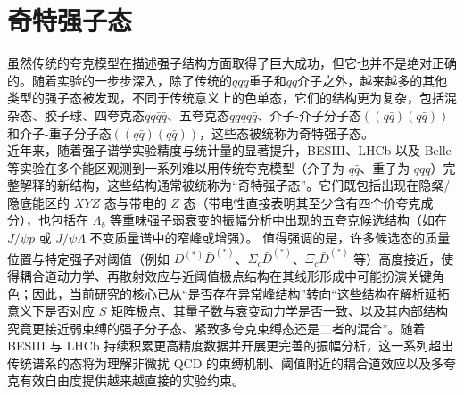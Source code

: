 \section{奇特强子态}
虽然传统的夸克模型在描述强子结构方面取得了巨大成功，但它也并不是绝对正确的。随着实验的一步步深入，除了传统的$qqq$重子和$q\bar{q}$介子之外，越来越多的其他类型的强子态被发现，不同于传统意义上的色单态，它们的结构更为复杂，包括混杂态、胶子球、四夸克态$qq\bar{q}\bar{q}$、五夸克态$qqqq\bar{q}$、介子-介子分子态$((q\bar{q})(q\bar{q}))$和介子-重子分子态$((q\bar{q})(q\bar{q}))$，这些态被统称为奇特强子态。\\
近年来，随着强子谱学实验精度与统计量的显著提升，BESIII、LHCb 以及 Belle 等实验在多个能区观测到一系列难以用传统夸克模型（介子为 $q\bar q$、重子为 $qqq$）完整解释的新结构，这些结构通常被统称为“奇特强子态”。它们既包括出现在隐粲/隐底能区的 $XYZ$ 态与带电的 $Z$ 态（带电性直接表明其至少含有四个价夸克成分），也包括在 $\Lambda_b$ 等重味强子弱衰变的振幅分析中出现的五夸克候选结构（如在 $J/\psi p$ 或 $J/\psi \Lambda$ 不变质量谱中的窄峰或增强）。
值得强调的是，许多候选态的质量位置与特定强子对阈值（例如 $D^{(*)}\bar D^{(*)}$、$\Sigma_c\bar D^{(*)}$、$\Xi_c\bar D^{(*)}$ 等）高度接近，使得耦合道动力学、再散射效应与近阈值极点结构在其线形形成中可能扮演关键角色；因此，当前研究的核心已从“是否存在异常峰结构”转向“这些结构在解析延拓意义下是否对应 $S$ 矩阵极点、其量子数与衰变动力学是否一致、以及其内部结构究竟更接近弱束缚的强子分子态、紧致多夸克束缚态还是二者的混合”。随着 BESIII 与 LHCb 持续积累更高精度数据并开展更完善的振幅分析，这一系列超出传统谱系的态将为理解非微扰 QCD 的束缚机制、阈值附近的耦合道效应以及多夸克有效自由度提供越来越直接的实验约束。


